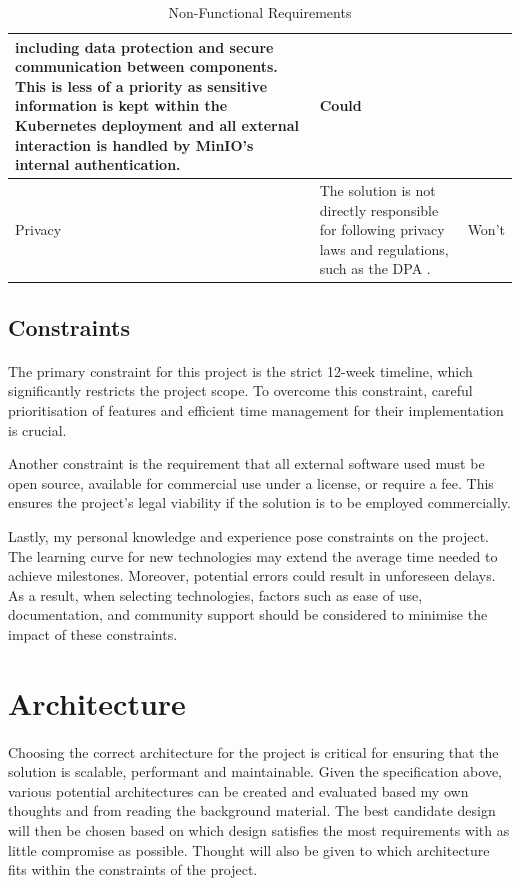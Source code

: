 \documentclass[12pt, conference, final, a4paper, onecolumn, compsoc]{IEEEtran}
\begin{document}
\begin{table}[H]
\begin{tabular}{|l|p{}|l|}
               including data protection and secure communication between
               components. This is less of a priority as sensitive information
               is kept within the Kubernetes deployment and all external
               interaction is handled by MinIO's internal authentication. & Could \\ \hline
    Privacy & The solution is not directly responsible for following privacy
              laws and regulations, such as the DPA \citep{dpa}. & Won't \\ \hline
  \end{tabular}
  \caption{Non-Functional Requirements}
  \label{tab:non_functional_requirements}
\end{table}

\subsection{Constraints}
\paragraph{}

The primary constraint for this project is the strict 12-week timeline, which
significantly restricts the project scope. To overcome this constraint, careful
prioritisation of features and efficient time management for their
implementation is crucial.

Another constraint is the requirement that all external software used must be
open source, available for commercial use under a license, or require a fee.
This ensures the project's legal viability if the solution is to be employed
commercially.

Lastly, my personal knowledge and experience pose constraints on the project.
The learning curve for new technologies may extend the average time needed to
achieve milestones. Moreover, potential errors could result in unforeseen
delays. As a result, when selecting technologies, factors such as ease of use,
documentation, and community support should be considered to minimise the impact
of these constraints.

\section{Architecture}

\paragraph{}
Choosing the correct architecture for the project is critical for ensuring that
the solution is scalable, performant and maintainable. Given the specification
above, various potential architectures can be created and evaluated based my own
thoughts and from reading the background material. The best candidate design
will then be chosen based on which design satisfies the most
requirements with as little compromise as possible. Thought will also be given
to which architecture fits within the constraints of the project.
\end{document}
